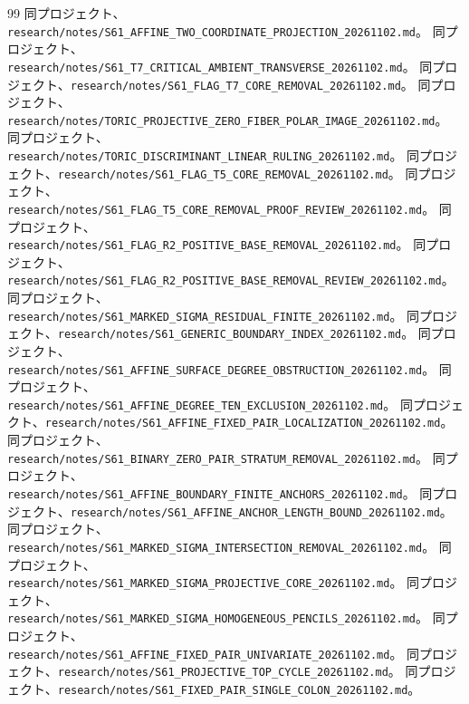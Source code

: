 \documentclass[11pt,a4paper]{ltjsarticle}
\theoremstyle{remark}
\begin{document}
\begin{thebibliography}{99}
 同プロジェクト、\nolinkurl{research/notes/S61_AFFINE_TWO_COORDINATE_PROJECTION_20261102.md}。
 同プロジェクト、\nolinkurl{research/notes/S61_T7_CRITICAL_AMBIENT_TRANSVERSE_20261102.md}。
 同プロジェクト、\nolinkurl{research/notes/S61_FLAG_T7_CORE_REMOVAL_20261102.md}。
 同プロジェクト、\nolinkurl{research/notes/TORIC_PROJECTIVE_ZERO_FIBER_POLAR_IMAGE_20261102.md}。
 同プロジェクト、\nolinkurl{research/notes/TORIC_DISCRIMINANT_LINEAR_RULING_20261102.md}。
 同プロジェクト、\nolinkurl{research/notes/S61_FLAG_T5_CORE_REMOVAL_20261102.md}。
 同プロジェクト、\nolinkurl{research/notes/S61_FLAG_T5_CORE_REMOVAL_PROOF_REVIEW_20261102.md}。
 同プロジェクト、\nolinkurl{research/notes/S61_FLAG_R2_POSITIVE_BASE_REMOVAL_20261102.md}。
 同プロジェクト、\nolinkurl{research/notes/S61_FLAG_R2_POSITIVE_BASE_REMOVAL_REVIEW_20261102.md}。
 同プロジェクト、\nolinkurl{research/notes/S61_MARKED_SIGMA_RESIDUAL_FINITE_20261102.md}。
 同プロジェクト、\nolinkurl{research/notes/S61_GENERIC_BOUNDARY_INDEX_20261102.md}。
 同プロジェクト、\nolinkurl{research/notes/S61_AFFINE_SURFACE_DEGREE_OBSTRUCTION_20261102.md}。
 同プロジェクト、\nolinkurl{research/notes/S61_AFFINE_DEGREE_TEN_EXCLUSION_20261102.md}。
 同プロジェクト、\nolinkurl{research/notes/S61_AFFINE_FIXED_PAIR_LOCALIZATION_20261102.md}。
 同プロジェクト、\nolinkurl{research/notes/S61_BINARY_ZERO_PAIR_STRATUM_REMOVAL_20261102.md}。
 同プロジェクト、\nolinkurl{research/notes/S61_AFFINE_BOUNDARY_FINITE_ANCHORS_20261102.md}。
 同プロジェクト、\nolinkurl{research/notes/S61_AFFINE_ANCHOR_LENGTH_BOUND_20261102.md}。
 同プロジェクト、\nolinkurl{research/notes/S61_MARKED_SIGMA_INTERSECTION_REMOVAL_20261102.md}。
 同プロジェクト、\nolinkurl{research/notes/S61_MARKED_SIGMA_PROJECTIVE_CORE_20261102.md}。
 同プロジェクト、\nolinkurl{research/notes/S61_MARKED_SIGMA_HOMOGENEOUS_PENCILS_20261102.md}。
 同プロジェクト、\nolinkurl{research/notes/S61_AFFINE_FIXED_PAIR_UNIVARIATE_20261102.md}。
 同プロジェクト、\nolinkurl{research/notes/S61_PROJECTIVE_TOP_CYCLE_20261102.md}。
 同プロジェクト、\nolinkurl{research/notes/S61_FIXED_PAIR_SINGLE_COLON_20261102.md}。

\end{thebibliography}
\end{document}
